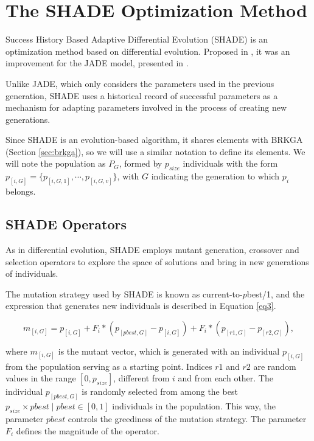 \documentclass[review]{elsarticle}
\begin{document}
\section{The SHADE Optimization Method} \label{sec:SHADE}

Success History Based Adaptive Differential Evolution (SHADE) is an optimization method based on differential evolution. Proposed in \cite{tanabe2013success}, it was an improvement for the JADE model, presented in \cite{zhang2009jade}.

Unlike JADE, which only considers the parameters used in the previous generation, SHADE uses a historical record of successful parameters as a mechanism for adapting parameters involved in the process of creating new generations.

Since SHADE is an evolution-based algorithm, it shares elements with BRKGA (Section \ref{sec:brkga}), so we will use a similar notation to define its elements. We will note the population as $P_G$, formed by $p_{size}$ individuals with the form $p_{[i,G]} = \{p_{[i,G,1]}, \cdots, p_{[i,G,v]}\}$, with $G$ indicating the generation to which $p_i$ belongs.

\subsection{SHADE Operators}

As in differential evolution, SHADE employs mutant generation, crossover and selection operators to explore the space of solutions and bring in new generations of individuals.

The mutation strategy used by SHADE is known as current-to-$p$best/1, and the expression that generates new individuals is described in Equation \eqref{eq3}.

\begin{equation}
m_{[i,G]} = p_{[i,G]} + F_i * (p_{[pbest, G]} - p_{[i,G]}) + F_i * (p_{[r1, G]} - p_{[r2,G]}),
\label{eq3}
\end{equation}

\noindent where $m_{[i,G]}$ is the mutant vector, which is generated with an individual $p_{[i,G]}$ from the population serving as a starting point. Indices $r1$ and $r2$ are random values in the range $[0,p_{size}]$, different from $i$ and from each other. The individual $p_{[pbest, G]}$ is randomly selected from among the best $p_{size} \times pbest\;|\;pbest\in [0,1]$ individuals in the population. This way, the parameter $pbest$ controls the greediness of the mutation strategy. The parameter $F_i$ defines the magnitude of the operator.
\end{document}
